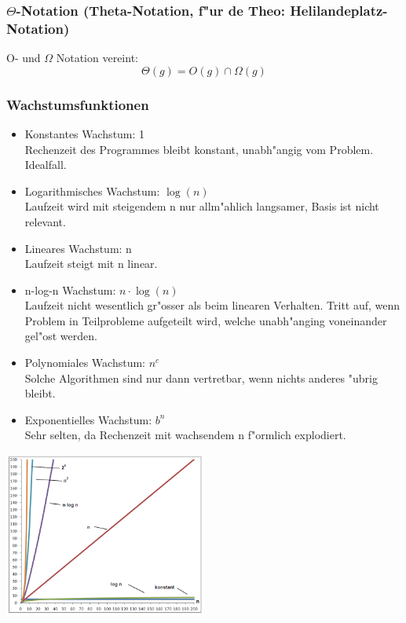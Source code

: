 \subsubsection{$\Theta$-Notation (Theta-Notation, f"ur de Theo: Helilandeplatz-Notation)}
O- und $\Omega$ Notation vereint: 
\begin{equation}
\Theta(g)= O(g) \cap \Omega(g)
\end{equation}

\subsubsection{Wachstumsfunktionen}
\begin{itemize}
\item Konstantes Wachstum: 1\\
			Rechenzeit des Programmes bleibt konstant, unabh"angig vom Problem. Idealfall.
\item Logarithmisches Wachstum: $\log(n)$\\
			Laufzeit wird mit steigendem n nur allm"ahlich langsamer, Basis ist nicht relevant.
\item Lineares Wachstum: n\\
			Laufzeit steigt mit n linear. 
\item n-log-n Wachstum: $n\cdot \log(n)$\\
			Laufzeit nicht wesentlich gr"osser als beim linearen Verhalten. Tritt auf, wenn Problem in Teilprobleme aufgeteilt wird, welche unabh"anging voneinander gel"ost werden. 
\item Polynomiales Wachstum: $n^c$\\
			Solche Algorithmen sind nur dann vertretbar, wenn nichts anderes "ubrig bleibt.  
\item Exponentielles Wachstum: $b^n$\\
			Sehr selten, da Rechenzeit mit wachsendem n f"ormlich explodiert. 
\end{itemize}

\begin{center}
{\includegraphics[width=0.5\textwidth]{images/Algorithmen/Wachstumsfunktionen.png}}
\label{Fig: Verschiedene Wachstumsfunktionen}
\end{center}

